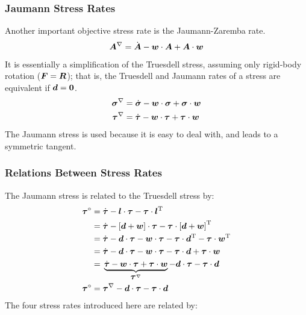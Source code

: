 \documentclass[10pt,letterpaper,oneside]{report}
\newcommand{\ten}[1]{\mbox{\boldmath $#1$}{}}
\newcommand{\scas}[1]{\mbox{{\scriptsize{${\rm{#1}}$}}}{}}
\begin{document}
\subsubsection{Jaumann Stress Rates}
Another important objective stress rate is the \hypertarget{Jaumann}{Jaumann-Zaremba rate}.  
\begin{equation}
\ten{A}^{\nabla} = \dot{\ten{A}} - \ten{w} \cdot \ten{A} + \ten{A} \cdot \ten{w}
\end{equation}
It is essentially a simplification of the Truesdell stress, assuming only rigid-body rotation ($\ten{F} = \ten{R}$);  that is, the Truesdell and Jaumann rates of a stress are equivalent if $\ten{d} = \ten{0}$.  
\begin{align}
\ten{\sigma}^{\nabla} ={}& \dot{\ten{\sigma}} - \ten{w} \cdot  \ten{\sigma} +  \ten{\sigma} \cdot \ten{w}
\\
\ten{ \tau}^{\nabla} ={}& \dot{\ten{\tau}} - \ten{w} \cdot \ten{\tau} +  \ten{\tau} \cdot \ten{w} 
\end{align}
The Jaumann stress is used because it is easy to deal with, and leads to a symmetric tangent.  


\subsubsection{Relations Between Stress Rates}
The Jaumann stress is related to the Truesdell stress by: 
\begin{align}
\ten{ \tau}^{\circ} ={}& \dot{ \ten{\tau} } -  \ten{l} \cdot \ten{\tau} - \ten{\tau} \cdot \ten{l}^{\scas{T}} 
\\
={}& \dot{ \ten{\tau} } - \left[ \ten{d} + \ten{w} \right] \cdot \ten{\tau} - \ten{\tau} \cdot \left[ \ten{d} + \ten{w} \right]^{\scas{T}} 
\notag \\
={}& \dot{ \ten{\tau} } - \ten{d} \cdot \ten{\tau} - \ten{w} \cdot \ten{\tau} - \ten{\tau} \cdot \ten{d}^{\scas{T}} - \ten{\tau} \cdot \ten{w}^{\scas{T}} 
\notag \\
={}& \dot{ \ten{\tau} } - \ten{d} \cdot \ten{\tau} - \ten{w} \cdot \ten{\tau} - \ten{\tau} \cdot \ten{d} + \ten{\tau} \cdot \ten{w} 
\notag \\
={}& \underbrace{ \dot{ \ten{\tau} } - \ten{w} \cdot \ten{\tau} + \ten{\tau} \cdot \ten{w} }_{ \ten{ \tau}^{\nabla} } - \ten{d} \cdot \ten{\tau} - \ten{\tau} \cdot \ten{d}  
\notag \\
\ten{ \tau}^{\circ} ={}& \ten{ \tau}^{\nabla} - \ten{d} \cdot \ten{\tau} - \ten{\tau} \cdot \ten{d}  
\end{align}
 The four stress rates introduced here are related by: 
\end{document}
